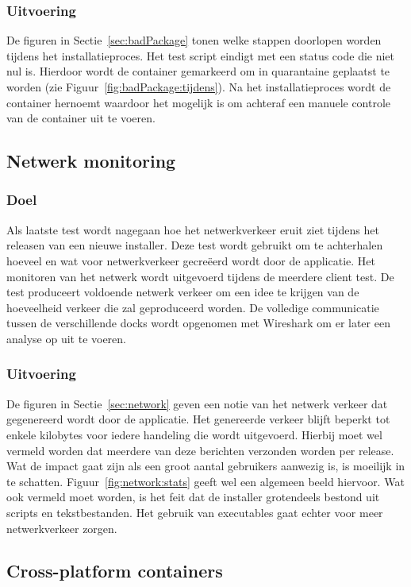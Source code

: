 \subsubsection{Uitvoering}
De figuren in Sectie~\ref{sec:badPackage} tonen welke stappen doorlopen worden tijdens het installatieproces.
Het test script eindigt met een status code die niet nul is.
Hierdoor wordt de container gemarkeerd om in quarantaine geplaatst te worden (zie Figuur~\ref{fig:badPackage:tijdens}).
Na het installatieproces wordt de container hernoemt waardoor het mogelijk is om achteraf een manuele controle van de container uit te voeren.

\subsection{Netwerk monitoring}
\subsubsection{Doel}
Als laatste test wordt nagegaan hoe het netwerkverkeer eruit ziet tijdens het releasen van een nieuwe installer.
Deze test wordt gebruikt om te achterhalen hoeveel en wat voor netwerkverkeer gecreëerd wordt door de applicatie.
Het monitoren van het netwerk wordt uitgevoerd tijdens de meerdere client test.
De test produceert voldoende netwerk verkeer om een idee te krijgen van de hoeveelheid verkeer die zal geproduceerd worden.
De volledige communicatie tussen de verschillende docks wordt opgenomen met Wireshark om er later een analyse op uit te voeren.

\subsubsection{Uitvoering}
De figuren in Sectie~\ref{sec:network} geven een notie van het netwerk verkeer dat gegenereerd wordt door de applicatie.
Het genereerde verkeer blijft beperkt tot enkele kilobytes voor iedere handeling die wordt uitgevoerd.
Hierbij moet wel vermeld worden dat meerdere van deze berichten verzonden worden per release.
Wat de impact gaat zijn als een groot aantal gebruikers aanwezig is, is moeilijk in te schatten.
Figuur~\ref{fig:network:stats} geeft wel een algemeen beeld hiervoor.
Wat ook vermeld moet worden, is het feit dat de installer grotendeels bestond uit scripts en tekstbestanden.
Het gebruik van executables gaat echter voor meer netwerkverkeer zorgen.

\subsection{Cross-platform containers}
